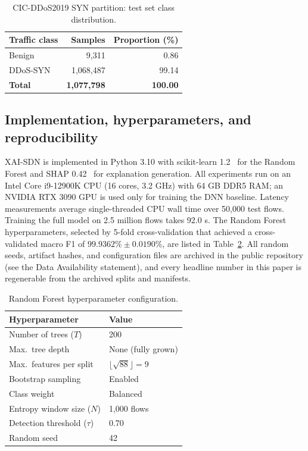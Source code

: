 ﻿\documentclass[journal]{IEEEtran}
\begin{document}
\begin{table}[!t]
\centering
\caption{CIC-DDoS2019 SYN partition: test set class distribution.}
\label{tab:dataset}
\begin{tabular}{@{}lrr@{}}
\toprule
\textbf{Traffic class} & \textbf{Samples} & \textbf{Proportion (\%)} \\
\midrule
Benign & 9,311 & 0.86 \\
DDoS-SYN & 1,068,487 & 99.14 \\
\midrule
\textbf{Total} & \textbf{1,077,798} & \textbf{100.00} \\
\bottomrule
\end{tabular}
\end{table}

\subsection{Implementation, hyperparameters, and reproducibility}
XAI-SDN is implemented in Python 3.10 with scikit-learn 1.2~\cite{pedregosa2011sklearn} for the Random Forest and SHAP 0.42~\cite{lundberg2017shap} for explanation generation. All experiments run on an Intel Core i9-12900K CPU (16 cores, 3.2 GHz) with 64 GB DDR5 RAM; an NVIDIA RTX 3090 GPU is used only for training the DNN baseline. Latency measurements average single-threaded CPU wall time over 50,000 test flows. Training the full model on 2.5 million flows takes 92.0 s. The Random Forest hyperparameters, selected by 5-fold cross-validation that achieved a cross-validated macro F1 of $99.9362\% \pm 0.0190\%$, are listed in Table~\ref{tab:hyperparams}. All random seeds, artifact hashes, and configuration files are archived in the public repository (see the Data Availability statement), and every headline number in this paper is regenerable from the archived splits and manifests.

\begin{table}[!t]
\centering
\caption{Random Forest hyperparameter configuration.}
\label{tab:hyperparams}
\begin{tabular}{@{}ll@{}}
\toprule
\textbf{Hyperparameter} & \textbf{Value} \\
\midrule
Number of trees ($T$) & 200 \\
Max.\ tree depth & None (fully grown) \\
Max.\ features per split & $\lfloor\sqrt{88}\rfloor = 9$ \\
Bootstrap sampling & Enabled \\
Class weight & Balanced \\
Entropy window size ($N$) & 1,000 flows \\
Detection threshold ($\tau$) & 0.70 \\
Random seed & 42 \\
\bottomrule
\end{tabular}
\end{table}
\end{document}
